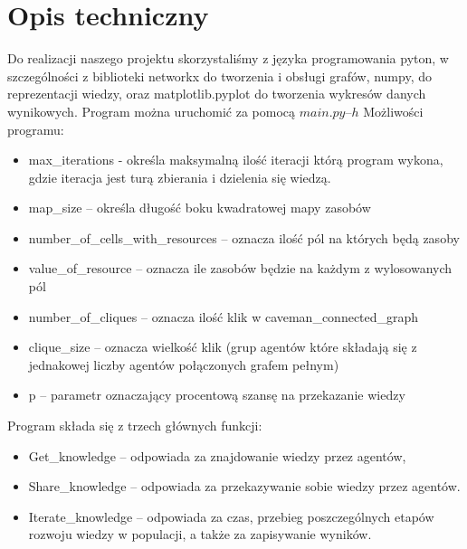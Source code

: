 \section{Opis techniczny}

Do realizacji naszego projektu skorzystaliśmy z języka programowania pyton, w szczególności z biblioteki networkx do tworzenia i obsługi grafów, numpy, do reprezentacji wiedzy, oraz matplotlib.pyplot do tworzenia wykresów danych wynikowych.
Program można uruchomić za pomocą $main.py –h$
Możliwości programu:

\begin{itemize}

\item  max\_iterations - określa maksymalną ilość iteracji którą program wykona, gdzie iteracja jest turą zbierania i dzielenia się wiedzą.
\item  map\_size – określa długość boku kwadratowej mapy zasobów
\item  number\_of\_cells\_with\_resources – oznacza ilość pól na których będą zasoby
\item  value\_of\_resource – oznacza ile zasobów będzie na każdym z wylosowanych pól
\item  number\_of\_cliques – oznacza ilość klik w caveman\_connected\_graph
\item  clique\_size – oznacza wielkość klik (grup agentów które składają się z jednakowej liczby agentów połączonych grafem pełnym)
\item p – parametr oznaczający procentową szansę na przekazanie wiedzy

\end{itemize}

Program składa się z trzech głównych funkcji:

\begin{itemize}

\item Get\_knowledge – odpowiada za znajdowanie wiedzy przez agentów,
\item Share\_knowledge – odpowiada za przekazywanie sobie wiedzy przez agentów.
\item Iterate\_knowledge – odpowiada za czas, przebieg poszczególnych etapów rozwoju wiedzy w populacji, a także za zapisywanie wyników.

\end{itemize}
